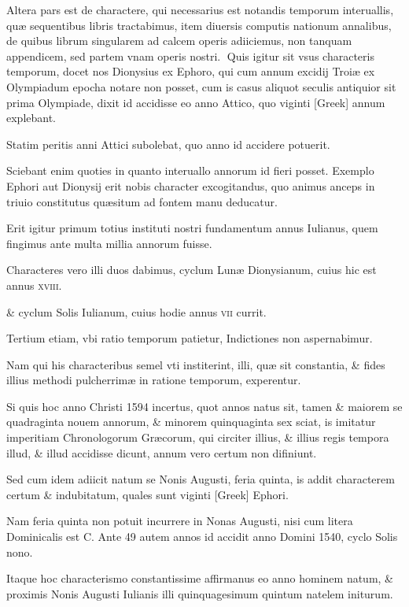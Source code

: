 \begin{parnumbers}

Altera pars est de charactere, qui necessarius est notandis temporum interuallis, quæ sequentibus libris tractabimus, item diuersis  computis nationum annalibus, de quibus librum singularem ad calcem operis adiiciemus, non tanquam appendicem, sed partem vnam operis nostri.
Quis igitur sit vsus characteris temporum, docet nos Dionysius ex Ephoro, qui cum annum excidij Troiæ ex Olympiadum epocha notare non posset, cum is casus aliquot seculis antiquior sit prima Olympiade, dixit id accidisse eo anno Attico, quo viginti \textgreek{[Greek]} annum explebant.

Statim peritis anni Attici subolebat, quo anno id accidere potuerit.

Sciebant enim quoties in quanto interuallo annorum id fieri posset. Exemplo Ephori aut Dionysij erit nobis character excogitandus, quo animus anceps in triuio constitutus quæsitum ad fontem manu deducatur.

Erit igitur primum  totius instituti nostri fundamentum annus Iulianus, quem fingimus ante multa millia annorum fuisse.

Characteres vero illi duos dabimus, cyclum Lunæ Dionysianum, cuius hic est annus \textsc{xviii}.

\& cyclum Solis Iulianum, cuius hodie annus \textsc{vii} currit.

Tertium etiam, vbi ratio temporum patietur, Indictiones non aspernabimur.

Nam qui his characteribus semel vti institerint, illi, quæ sit constantia, \& fides illius methodi pulcherrimæ in ratione temporum, experentur.

Si quis hoc anno Christi 1594 incertus, quot annos natus sit, tamen \& maiorem se quadraginta nouem annorum, \& minorem quinquaginta sex sciat, is imitatur imperitiam Chronologorum Græcorum, qui circiter illius, \& illius regis tempora illud, \& illud accidisse dicunt, annum  vero certum non difiniunt.

Sed cum idem adiicit natum se Nonis Augusti, feria quinta, is addit characterem certum \& indubitatum, quales sunt viginti \textgreek{[Greek]} Ephori.

Nam feria quinta non potuit incurrere in Nonas Augusti, nisi cum litera Dominicalis est C. Ante 49 autem annos id accidit anno Domini 1540, cyclo Solis nono.

Itaque hoc characterismo constantissime affirmanus eo anno hominem natum, \& proximis Nonis Augusti Iulianis illi quinquagesimum quintum natelem initurum.


\end{parnumbers}

